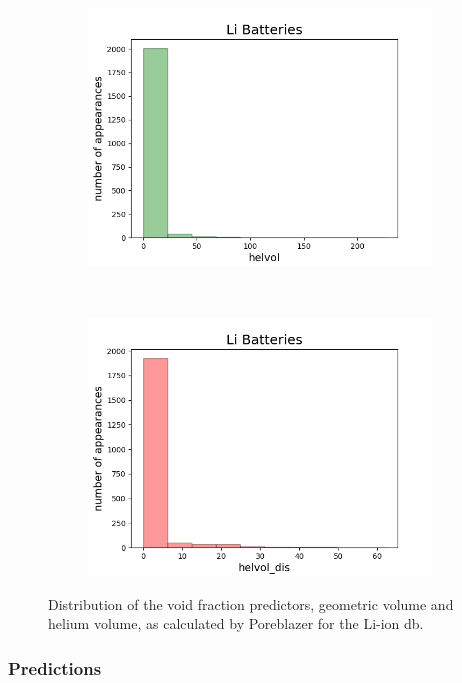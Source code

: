 \begin{figure}[h]
\begin{subfigure}{0.23\textwidth}
         \includegraphics[width=\linewidth]{result/figures/distribution/Li_distrof_helvol.png}
     \end{subfigure}
          ~ 
     \begin{subfigure}{0.23\textwidth}
         \centering
         \includegraphics[width=\linewidth]{result/figures/distribution/Li_distrof_helvol_dis.png}
     \end{subfigure}
\caption{Distribution of the void fraction predictors, geometric volume and helium volume, as calculated by Poreblazer for the Li-ion db.}
\label{fig:Li_distri_VF}
\end{figure}


\subsubsection{Predictions}


